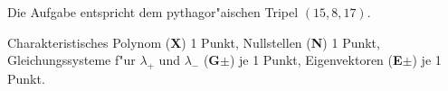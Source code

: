 \begin{diskussion}
Die Aufgabe entspricht dem pythagor"aischen Tripel $(15,8,17)$.
\end{diskussion}

\begin{bewertung}
Charakteristisches Polynom ({\bf X}) 1 Punkt,
Nullstellen ({\bf N}) 1 Punkt,
Gleichungssysteme f"ur $\lambda_+$ und $\lambda_-$ ({\bf G$\pm$}) je 1 Punkt,
Eigenvektoren ({\bf E$\pm$}) je 1 Punkt.
\end{bewertung}

